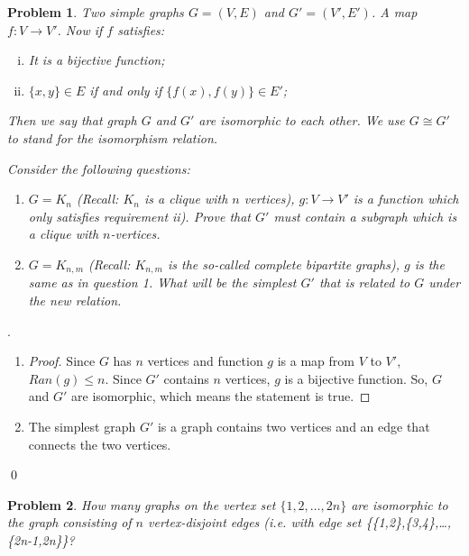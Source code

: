 \documentclass[12pt]{article}
\newtheorem{hw}{Problem}
\newenvironment{sol}
  {\par\vspace{3mm}\noindent{\it Solution}.}
  {\qed}
\begin{document}
\begin{hw}%

\noindent Two simple graphs $G=(V,E)$ and $G'=(V',E')$. A map $f: V\rightarrow V'$. Now if $f$ satisfies:
\begin{enumerate}[i)]
  \item It is a bijective function;
  \item $\{x,y\}\in E$ if and only if $\{f(x), f(y)\}\in E'$;
\end{enumerate}
Then we say that graph $G$ and $G'$ are \emph{isomorphic} to each other. We use  $G\cong G'$ to stand for the isomorphism relation.

Consider the following questions:
\begin{enumerate}
  \item $G=K_n$ (Recall: $K_n$ is a clique with $n$ vertices), $g: V\rightarrow V'$ is a function which only satisfies requirement ii). Prove that $G'$ must contain a subgraph which is a clique with $n$-vertices.
  \item $G=K_{n,m}$ (Recall: $K_{n,m}$ is the so-called \emph{complete bipartite graphs}), $g$ is the same as in question 1.  What will be the simplest $G'$ that is related to $G$ under the new relation.
\end{enumerate}
\end{hw}

\begin{sol}
    \begin{enumerate}
        \item \begin{proof}
        Since $G$ has $n$ vertices and function $g$ is a map from $V$ to $V'$, $Ran(g)\leq n$. Since $G'$ contains $n$ vertices, $g$ is a bijective function. So, $G$ and $G'$ are isomorphic, which means the statement is true.
        \end{proof}
        \item The simplest graph $G'$ is a graph contains two vertices and an edge that connects the two vertices.
    \end{enumerate}
\end{sol}


\begin{hw}
How many graphs on the vertex set $\{1,2,\ldots,2n\}$ are isomorphic to the graph consisting of $n$ vertex-disjoint edges (i.e. with edge set \{\{1,2\},\{3,4\},\ldots, \{2n-1,2n\}\}?
\end{hw}
\end{document}
